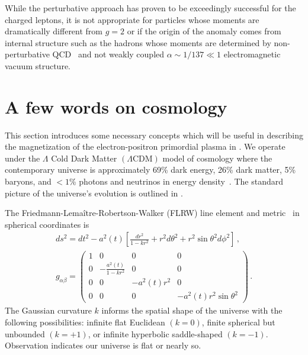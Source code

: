 While the perturbative approach has proven to be exceedingly successful for the charged leptons, it is not appropriate for particles whose moments are dramatically different from $g\!=\!2$ or if the origin of the anomaly comes from internal structure such as the hadrons whose moments are determined by non-perturbative QCD~\citep{Pacetti:2014jai} and not weakly coupled $\alpha\sim1/137\ll1$ electromagnetic vacuum structure.

\section{A few words on cosmology}
\label{sec:flrw}
\noindent This section introduces some necessary concepts which will be useful in describing the magnetization of the electron-positron primordial plasma in . We operate under the $\Lambda$ Cold Dark Matter $(\Lambda\mathrm{CDM})$ model of cosmology where the contemporary universe is approximately 69\% dark energy, 26\% dark matter, 5\% baryons, and $<1$\% photons and neutrinos in energy density~\citep{Davis:2003ad,Planck:2018vyg}. The standard picture of the universe's evolution is outlined in .

The Friedmann-Lema{\^i}tre-Robertson-Walker (FLRW) line element and metric~\citep{weinberg1972gravitation} in spherical coordinates is
\begin{gather}
    \label{FLRW} ds^2=dt^2-a^2(t)\left[\frac{dr^2}{1-kr^{2}}+r^{2}d\theta^2+r^{2}\sin\theta^{2}d\phi^2\right]\,,\\
    g_{\alpha\beta}=
    \begin{pmatrix}
        1&0&0&0\\
        0&-\frac{a^{2}(t)}{1-kr^{2}}&0&0\\
        0&0&-a^{2}(t)r^{2}&0\\
        0&0&0&-a^{2}(t)r^{2}\sin\theta^{2}
    \end{pmatrix}\,.
\end{gather}
The Gaussian curvature $k$ informs the spatial shape of the universe with the following possibilities: infinite flat Euclidean $(k=0)$, finite spherical but unbounded $(k=+1)$, or infinite hyperbolic saddle-shaped $(k=-1)$. Observation indicates our universe is flat or nearly so.

